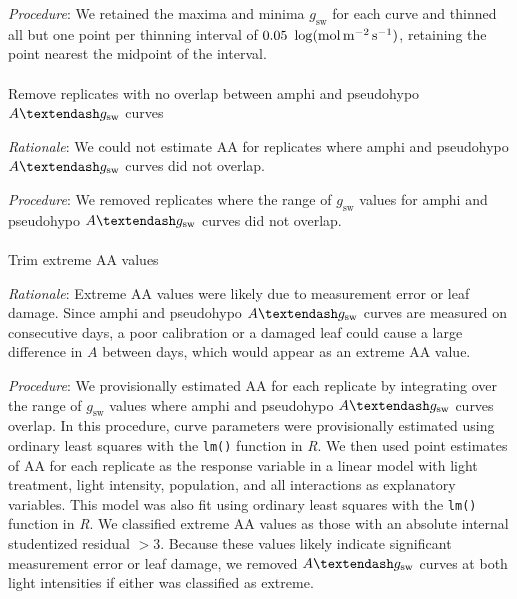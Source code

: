 \documentclass[
  letterpaper,
  DIV=11,
  numbers=noendperiod]{scrartcl}
\makeatletter
\let\oldparagraph\paragraph
\renewcommand{\paragraph}{
    \@ifstar
      \xxxParagraphStar
      \xxxParagraphNoStar
  }
\newcommand{\xxxParagraphStar}[1]{\oldparagraph*{#1}\mbox{}}
\newcommand{\xxxParagraphNoStar}[1]{\oldparagraph{#1}\mbox{}}
\newcommand{\aax}{$\mathrm{AA}$}
\newcommand{\agcurve}{$A \textendash g_\text{sw}$}
\newcommand{\gsw}{$g_\text{sw}$}
\makeatother
\begin{document}
\emph{Procedure}: We retained the maxima and minima \gsw{} for each
curve and thinned all but one point per thinning interval of
\(0.05~\log(\si{\mol\raiseto{-2}\meter\raiseto{-1}\second})\), retaining
the point nearest the midpoint of the interval.

\paragraph{\texorpdfstring{Remove replicates with no overlap between
amphi and pseudohypo \agcurve{}
curves}{Remove replicates with no overlap between amphi and pseudohypo  curves}}\label{remove-replicates-with-no-overlap-between-amphi-and-pseudohypo-curves}

\emph{Rationale}: We could not estimate \aax{} for replicates where
amphi and pseudohypo \agcurve{} curves did not overlap.

\emph{Procedure}: We removed replicates where the range of \gsw{} values
for amphi and pseudohypo \agcurve{} curves did not overlap.

\paragraph{\texorpdfstring{Trim extreme \aax{}
values}{Trim extreme  values}}\label{trim-extreme-values}

\emph{Rationale}: Extreme \aax{} values were likely due to measurement
error or leaf damage. Since amphi and pseudohypo \agcurve{} curves are
measured on consecutive days, a poor calibration or a damaged leaf could
cause a large difference in \(A\) between days, which would appear as an
extreme \aax{} value.

\emph{Procedure}: We provisionally estimated \aax{} for each replicate
by integrating over the range of \gsw{} values where amphi and
pseudohypo \agcurve{} curves overlap. In this procedure, curve
parameters were provisionally estimated using ordinary least squares
with the \texttt{lm()} function in \emph{R}. We then used point
estimates of \aax{} for each replicate as the response variable in a
linear model with light treatment, light intensity, population, and all
interactions as explanatory variables. This model was also fit using
ordinary least squares with the \texttt{lm()} function in \emph{R}. We
classified extreme \aax{} values as those with an absolute internal
studentized residual \(> 3\). Because these values likely indicate
significant measurement error or leaf damage, we removed \agcurve{}
curves at both light intensities if either was classified as extreme.
\end{document}
